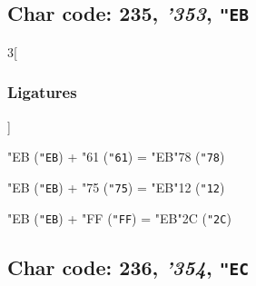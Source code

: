 \documentclass{article}
\newlength{\maxcharwidth}
\begin{document}
\subsection{Char code: 235, {\it'353}, {\tt"EB}}
\label{char_235}


\begin{multicols}{3}[\subsubsection{Ligatures}]

{\testfont\char"EB\noboundary} ({\tt"EB}) + {\testfont\char"61\noboundary} ({\tt"61}) = {\testfont\char"EB\noboundary}{\testfont\char"78\noboundary} ({\tt"78}) 

{\testfont\char"EB\noboundary} ({\tt"EB}) + {\testfont\char"75\noboundary} ({\tt"75}) = {\testfont\char"EB\noboundary}{\testfont\char"12\noboundary} ({\tt"12}) 

{\testfont\char"EB\noboundary} ({\tt"EB}) + {\testfont\char"FF\noboundary} ({\tt"FF}) = {\testfont\char"EB\noboundary}{\testfont\char"2C\noboundary} ({\tt"2C}) 

\end{multicols}

\subsection{Char code: 236, {\it'354}, {\tt"EC}}
\label{char_236}

\end{document}
